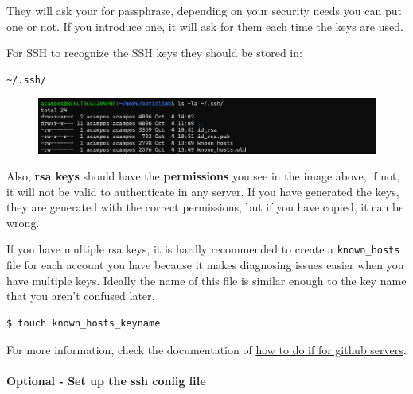 \documentclass{article}
\newenvironment{blocktemplateII}[1]{%
    \tcolorbox[beamer,%
    noparskip,breakable,
    colframe=Green,%
    colbacklower=LimeGreen!75!LightGreen,%
    title=#1]}%
    {\endtcolorbox}
\newenvironment{blocktemplateIII}[1]{%
    \tcolorbox[beamer,%
    noparskip,breakable,
    ,colframe=Red,%
    colbacklower=LimeGreen!75!LightGreen,%
    title=#1]}%
    {\endtcolorbox}
\newenvironment{codetemplate}[1][]{%
  \mybasecolorbox[#1]
  \itshape
}{%
  \endmybasecolorbox
}
\begin{document}
They will ask your for passphrase, depending on your security needs you can put one or not. If you introduce one, it will ask for them each time the keys are used.

\begin{blocktemplateIII}{WARNING}
For SSH to recognize the SSH keys they should be stored in:
\begin{codetemplate}{}
\begin{verbatim}
~/.ssh/
\end{verbatim}
\end{codetemplate}
\begin{figure}[H]
    \includegraphics[width=\textwidth]{pictures/ssh2.png}
    \centering
\end{figure}
Also, \textbf{rsa keys} should have the \textbf{permissions} you see in the image above, if not, it will not be valid to authenticate in any server. If you have generated the keys, they are generated with the correct permissions, but if you have copied, it can be wrong.
\end{blocktemplateIII}

\begin{blocktemplateII}{Note}
If you have multiple rsa keys, it is hardly recommended to create a \verb+known_hosts+ file for each account you have because it makes diagnosing issues easier when you have multiple keys. Ideally the name of this file is similar enough to the key name that you aren't confused later.

\begin{codetemplate}{}
\begin{verbatim}
$ touch known_hosts_keyname
\end{verbatim}
\end{codetemplate}
\end{blocktemplateII}

For more information, check the documentation of \href{https://docs.github.com/en/authentication/connecting-to-github-with-ssh/generating-a-new-ssh-key-and-adding-it-to-the-ssh-agent}{how to do if for github servers}.

\paragraph{Optional - Set up the ssh config file}
\end{document}
